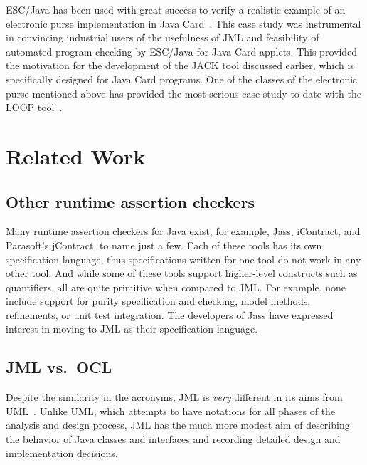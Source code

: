 \documentclass{entcs}
\begin{document}
ESC/Java has been used with great success to verify a realistic
example of an electronic purse implementation in Java
Card~\cite{CatanoHuisman02}. This case study was instrumental in
convincing industrial users of the usefulness of JML and feasibility
of automated program checking by ESC/Java for Java Card applets.  This
provided the motivation for the development of the JACK tool discussed
earlier, which is specifically designed for Java Card programs.  One
of the classes of the electronic purse mentioned above has provided
the most serious case study to date with the LOOP
tool~\cite{BreunesseBJ02}.

\section{Related Work}
\label{related}

\subsection{Other runtime assertion checkers}

Many runtime assertion checkers for Java exist, for example, Jass,
iContract, and Parasoft's jContract, to name just a few.  Each of
these tools has its own specification language, thus specifications
written for one tool do not work in any other tool.  And while some of
these tools support higher-level constructs such as quantifiers, all
are quite primitive when compared to JML\@.  For example, none include
support for purity specification and checking, model methods,
refinements, or unit test integration.  The developers of Jass have
expressed interest in moving to JML as their specification language.


\subsection{JML vs.\ OCL}

Despite the similarity in the acronyms, JML is {\em very} different in
its aims from UML~\cite{RumbaughJacobsonBooch98}.  Unlike UML, which
attempts to have notations for all phases of the analysis and design
process, JML has the much more modest aim of describing the behavior
of Java classes and interfaces and recording detailed design and
implementation decisions.
\end{document}
